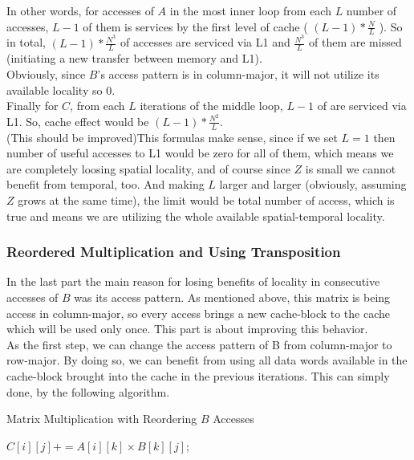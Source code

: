 \documentclass[paper=a4, fontsize=11pt]{scrartcl} %
\numberwithin{equation}{section} %
\numberwithin{figure}{section} %
\numberwithin{table}{section} %
\begin{document}
In other words, for accesses of $A$ in the most inner loop from each $L$ number of accesses, $L-1$ of them is services by the first level of cache ( $(L-1) * \frac{N}{L}$ ). So in total, $(L-1) * \frac{N^{3}}{L}$ of accesses are serviced via L1 and $\frac{N^{3}}{L}$ of them are missed (initiating a new transfer between memory and L1).\\
Obviously, since $B$'s access pattern is in column-major, it will not utilize its available locality so $0$.\\
Finally for $C$, from each $L$ iterations of the middle loop, $L-1$ of are serviced via L1. So, cache effect would be $(L-1) * \frac{N^{2}}{L}$.\\
(This should be improved)This formulas make sense, since if we set $L = 1$ then number of useful accesses to L1 would be zero for all of them, which means we are completely loosing spatial locality, and of course since $Z$ is small we cannot benefit from temporal, too. And making $L$ larger and larger (obviously, assuming $Z$ grows at the same time), the limit would be total number of access, which is true and means we are utilizing the whole available spatial-temporal locality.

\subsubsection{Reordered Multiplication and Using Transposition}
In the last part the main reason for losing benefits of locality in consecutive accesses of $B$ was its access pattern. As mentioned above, this matrix is being access in column-major, so every access brings a new cache-block to the cache which will be used only once. This part is about improving this behavior.\\
As the first step, we can change the access pattern of B from column-major to row-major. By doing so, we can benefit from using all data words available in the cache-block brought into the cache in the previous iterations. This can simply done, by the following algorithm.\\

\begin{algorithm}
\caption{Matrix Multiplication with Reordering $B$ Accesses}
\label{Reorder-Alg}
\begin{algorithmic}
		\State $C[ i ][ j ] += A[ i ][ k ] \times B[ k ][ j ]$; 
		\EndFor
	\EndFor
\EndFor
\end{algorithmic}
\end{algorithm}
\end{document}
